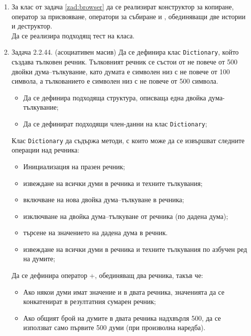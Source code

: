 \begin{enumerate}[resume]

  \item За клас  от задача \ref{zad:browser} да се реализират конструктор за копиране, оператор за присвояване, оператори за събиране \code{+} и \code{+=}, обединяващи две истории и деструктор.\\

  Да се реализира подходящ тест на класа.

  \item Задача 2.2.44. (асоциативен масив) \cite{sbornik2}\label{zad:dict1} Да се дефинира клас \texttt{Dictionary}, който създава тълковен речник. Тълковният речник се състои от не повече от 500 двойки дума–тълкувание, като думата е символен низ с не повече от 100 символа, а тълкованието е символен низ с не повече от 500 символа.

  \begin{itemize}
  	\item Да се дефинира подходяща структура, описваща една двойка дума-тълкувание;
  	\item Да се дефинират подходящи член-данни на клас \texttt{Dictionary};
  \end{itemize}

  Клас \texttt{Dictionary} да съдържа методи, с които може да се извършват следните операции над речника:

  \begin{itemize}

  \item Инициализация на празен речник;
  \item извеждане на всички думи в речника и техните тълкувания;
  \item включване на нова двойка дума–тълкуване в речника;
  \item изключване на двойка дума–тълкуване от речника (по дадена дума);
  \item търсене на значението на дадена дума в речник.
  \item извеждане на всички думи в речника и техните тълкувания по азбучен ред на думите;
  \end{itemize}

  Да се дефинира оператор +, обединяващ два речника, такъв че:

  \begin{itemize}
   \item Ако някои думи имат значение и в двата речника, значенията да се конкатенират в резултатния сумарен речник;
   \item Ако общият брой на думите в двата речника надхвърля 500, да се използват само първите 500 думи (при произволна наредба).
  \end{itemize}



\end{enumerate}
